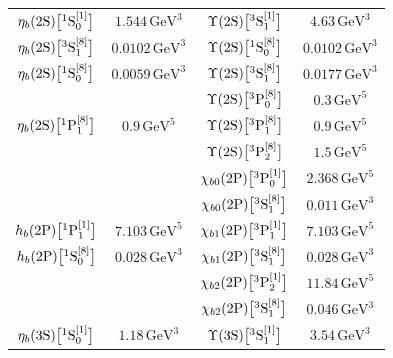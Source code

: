 \begin{longtable}[t]{cc|cc}
\midrule 
$\eta_b(2\mathrm{S})\big[{}^1\mathrm{S}_0^{[1]}\big]$   & $1.544  \,\mathrm{GeV}^{3}$ & $\Upsilon(2\mathrm{S})\big[{}^3\mathrm{S}_1^{[1]}\big]$ & $4.63   \,\mathrm{GeV}^{3}$ \\
$\eta_b(2\mathrm{S})\big[{}^3\mathrm{S}_1^{[8]}\big]$   & $0.0102 \,\mathrm{GeV}^{3}$ & $\Upsilon(2\mathrm{S})\big[{}^1\mathrm{S}_0^{[8]}\big]$ & $0.0102 \,\mathrm{GeV}^{3}$ \\
$\eta_b(2\mathrm{S})\big[{}^1\mathrm{S}_0^{[8]}\big]$   & $0.0059 \,\mathrm{GeV}^{3}$ & $\Upsilon(2\mathrm{S})\big[{}^3\mathrm{S}_1^{[8]}\big]$ & $0.0177 \,\mathrm{GeV}^{3}$ \\
                                                &                             &  
$\Upsilon(2\mathrm{S})\big[{}^3\mathrm{P}_0^{[8]}\big]$ & $0.3    \,\mathrm{GeV}^{5}$ \\
$\eta_b(2\mathrm{S})\big[{}^1\mathrm{P}_1^{[8]}\big]$   & $0.9    \,\mathrm{GeV}^{5}$ & $\Upsilon(2\mathrm{S})\big[{}^3\mathrm{P}_1^{[8]}\big]$ & $0.9    \,\mathrm{GeV}^{5}$ \\
                                                &                             &  
$\Upsilon(2\mathrm{S})\big[{}^3\mathrm{P}_2^{[8]}\big]$ & $1.5    \,\mathrm{GeV}^{5}$ \\
\midrule
                                                 &                            &  
$\chi_{b0}(2\mathrm{P})\big[{}^3\mathrm{P}_0^{[1]}\big]$ & $2.368 \,\mathrm{GeV}^{5}$ \\
                                                 &                            &  
$\chi_{b0}(2\mathrm{P})\big[{}^3\mathrm{S}_1^{[8]}\big]$ & $0.011 \,\mathrm{GeV}^{3}$ \\
$h_b(2\mathrm{P})\big[{}^1\mathrm{P}_1^{[1]}\big]$       & $7.103 \,\mathrm{GeV}^{5}$ & 
$\chi_{b1}(2\mathrm{P})\big[{}^3\mathrm{P}_1^{[1]}\big]$ & $7.103 \,\mathrm{GeV}^{5}$ \\
$h_b(2\mathrm{P})\big[{}^1\mathrm{S}_0^{[8]}\big]$       & $0.028 \,\mathrm{GeV}^{3}$ & 
$\chi_{b1}(2\mathrm{P})\big[{}^3\mathrm{S}_1^{[8]}\big]$ & $0.028 \,\mathrm{GeV}^{3}$ \\
                                                 &                            &  
$\chi_{b2}(2\mathrm{P})\big[{}^3\mathrm{P}_2^{[1]}\big]$ & $11.84 \,\mathrm{GeV}^{5}$ \\
                                                 &                            &  
$\chi_{b2}(2\mathrm{P})\big[{}^3\mathrm{S}_1^{[8]}\big]$ & $0.046 \,\mathrm{GeV}^{3}$ \\
\midrule
$\eta_b(3\mathrm{S})\big[{}^1\mathrm{S}_0^{[1]}\big]$       & $1.18    \,\mathrm{GeV}^{3}$ & $\Upsilon(3{\mathrm{S}})\big[{}^3{\mathrm{S}}_1^{[1]}\big]$ & $3.54    \,\mathrm{GeV}^{3}$ \\

\end{longtable}
